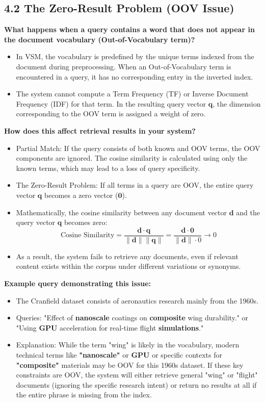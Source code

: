\documentclass{article}
\begin{document}
\subsection*{4.2 The Zero-Result Problem (OOV Issue)}

\textbf{What happens when a query contains a word that does not appear in the document vocabulary (Out-of-Vocabulary term)?}
\begin{itemize}
    \item In VSM, the vocabulary is predefined by the unique terms indexed from the document during preprocessing. When an Out-of-Vocabulary term is encountered in a query, it has no corresponding entry in the inverted index.
    \item The system cannot compute a Term Frequency (TF) or Inverse Document Frequency (IDF) for that term. In the resulting query vector $\mathbf{q}$, the dimension corresponding to the OOV term is assigned a weight of zero.
\end{itemize}

\textbf{How does this affect retrieval results in your system?}
\begin{itemize}
    \item {Partial Match:} If the query consists of both known and OOV terms, the OOV components are ignored. The cosine similarity is calculated using only the known terms, which may lead to a loss of query specificity.
    \item {The Zero-Result Problem:} If all terms in a query are OOV, the entire query vector $\mathbf{q}$ becomes a zero vector ($\mathbf{0}$).
    \item Mathematically, the cosine similarity between any document vector $\mathbf{d}$ and the query vector $\mathbf{q}$ becomes zero:
    \[ \text{Cosine\ Similarity} = \frac{\mathbf{d} \cdot \mathbf{q}}{\|\mathbf{d}\| \|\mathbf{q}\|} = \frac{\mathbf{d} \cdot \mathbf{0}}{\|\mathbf{d}\| \cdot 0} \rightarrow 0 \]
    \item As a result, the system fails to retrieve any documents, even if relevant content exists within the corpus under different variations or synonyms.
\end{itemize}

\textbf{Example query demonstrating this issue:}
\begin{itemize}
    \item The Cranfield dataset consists of aeronautics research mainly from the 1960s.
    \item{Queries:} "Effect of \textbf{nanoscale} coatings on \textbf{composite} wing durability." or "Using \textbf{GPU} acceleration for real-time flight \textbf{simulations}."
    
    \item{Explanation:} While the term "wing" is likely in the vocabulary, modern technical terms like \textbf{"nanoscale"} or \textbf{GPU} or specific
    contexts for \textbf{"composite"} materials may be OOV for this 1960s dataset. If these key constraints are OOV, the system will either retrieve general "wing" or "flight" documents (ignoring the specific research intent) or return no results at all if the entire phrase is missing from the index.
\end{itemize}
\end{document}
